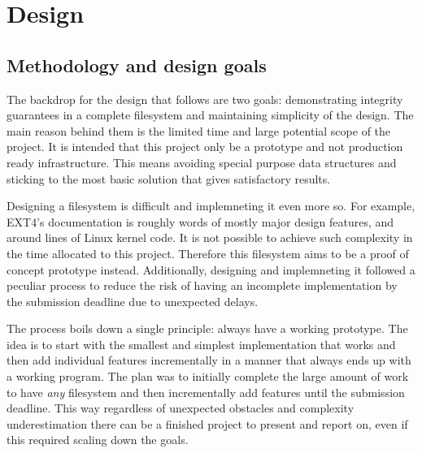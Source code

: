 \chapter{Design}

    \section{Methodology and design goals}
        \label{sec_methodology}

        The backdrop for the design that follows are two goals: demonstrating
        integrity guarantees in a complete filesystem and maintaining
        simplicity of the design. The main reason behind them is the limited
        time and large potential scope of the project. It is intended that this
        project only be a prototype and not production ready infrastructure.
        This means avoiding special purpose data structures and sticking to the
        most basic solution that gives satisfactory results.

        Designing a filesystem is difficult and implemneting it even more so.
        For example, EXT4's documentation \cite{ext4_docs} is roughly
         words of mostly major design features, and around
         lines of Linux kernel code. It is not possible to
        achieve such complexity in the time allocated to this project.
        Therefore this filesystem aims to be a proof of concept prototype
        instead. Additionally, designing and implemneting it followed a
        peculiar process to reduce the risk of having an incomplete
        implementation by the submission deadline due to unexpected delays.

        The process boils down a single principle: always have a working
        prototype. The idea is to start with the smallest and simplest
        implementation that works and then add individual features
        incrementally in a manner that always ends up with a working program.
        The plan was to initially complete the large amount of work to have
        \textit{any} filesystem and then incrementally add features until the
        submission deadline. This way regardless of unexpected obstacles and
        complexity underestimation there can be a finished project to present
        and report on, even if this required scaling down the goals.



